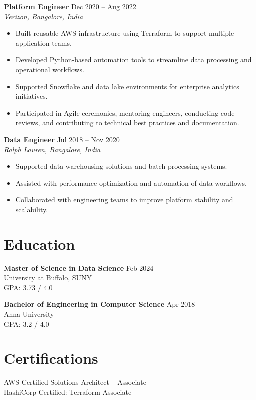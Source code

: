 \documentclass[10pt]{article} %
\begin{document}
\textbf{Platform Engineer} \hfill Dec 2020 -- Aug 2022 \\
\textit{Verizon, Bangalore, India}
\begin{itemize}[leftmargin=*, itemsep=3pt]
    \item Built reusable AWS infrastructure using Terraform to support multiple application teams. %
    \item Developed Python-based automation tools to streamline data processing and operational workflows. %
    \item Supported Snowflake and data lake environments for enterprise analytics initiatives. %
    \item Participated in Agile ceremonies, mentoring engineers, conducting code reviews, and contributing to technical best practices and documentation.
\end{itemize}

\textbf{Data Engineer} \hfill Jul 2018 -- Nov 2020 \\
\textit{Ralph Lauren, Bangalore, India}
\begin{itemize}[leftmargin=*, itemsep=3pt]
    \item Supported data warehousing solutions and batch processing systems. %
    \item Assisted with performance optimization and automation of data workflows. %
    \item Collaborated with engineering teams to improve platform stability and scalability. %
\end{itemize}

\section*{Education}

\textbf{Master of Science in Data Science} \hfill Feb 2024 \\
University at Buffalo, SUNY \\
GPA: 3.73 / 4.0

\textbf{Bachelor of Engineering in Computer Science} \hfill Apr 2018 \\
Anna University \\
GPA: 3.2 / 4.0

\section*{Certifications}
AWS Certified Solutions Architect – Associate \\
HashiCorp Certified: Terraform Associate
\end{document}
